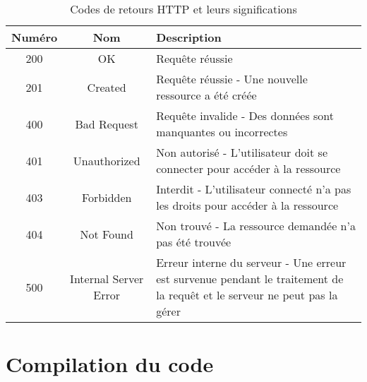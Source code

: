 \begin{table}[H]
    \centering
    \caption{Codes de retours HTTP et leurs significations}
    \begin{tabular}{|c|c|p{8cm}|} %
        \hline
        \textbf{Numéro} & \textbf{Nom}          & \textbf{Description}                                                                                                      \\
        \hline
        200             & OK                    & Requête réussie                                                                                                           \\
        \hline
        201             & Created               & Requête réussie - Une nouvelle ressource a été créée                                                                      \\
        \hline
        400             & Bad Request           & Requête invalide - Des données sont manquantes ou incorrectes                                                             \\
        \hline
        401             & Unauthorized          & Non autorisé - L'utilisateur doit se connecter pour accéder à la ressource                                                \\
        \hline
        403             & Forbidden             & Interdit - L'utilisateur connecté n'a pas les droits pour accéder à la ressource                                          \\
        \hline
        404             & Not Found             & Non trouvé - La ressource demandée n'a pas été trouvée                                                                    \\
        \hline
        500             & Internal Server Error & Erreur interne du serveur - Une erreur est survenue pendant le traitement de la requêt et le serveur ne peut pas la gérer \\
        \hline
    \end{tabular}
\end{table}

\section{Compilation du code}